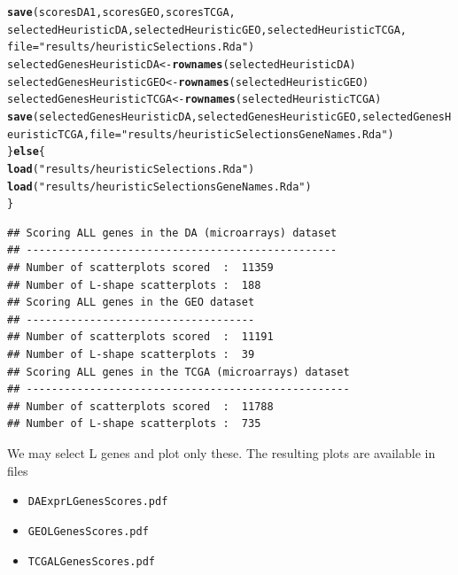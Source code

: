\documentclass[a4paper,10pt]{article}\usepackage[]{graphicx}\usepackage[]{color}
\makeatletter
\newcommand{\hlstr}[1]{\textcolor[rgb]{0.192,0.494,0.8}{#1}}%
\newcommand{\hlstd}[1]{\textcolor[rgb]{0.345,0.345,0.345}{#1}}%
\newcommand{\hlkwa}[1]{\textcolor[rgb]{0.161,0.373,0.58}{\textbf{#1}}}%
\newcommand{\hlkwb}[1]{\textcolor[rgb]{0.69,0.353,0.396}{#1}}%
\newcommand{\hlkwc}[1]{\textcolor[rgb]{0.333,0.667,0.333}{#1}}%
\newcommand{\hlkwd}[1]{\textcolor[rgb]{0.737,0.353,0.396}{\textbf{#1}}}%
\newenvironment{kframe}{%
 \def\at@end@of@kframe{}%
 \ifinner\ifhmode%
  \def\at@end@of@kframe{\end{minipage}}%
  \begin{minipage}{\columnwidth}%
 \fi\fi%
 \def\FrameCommand##1{\hskip\@totalleftmargin \hskip-\fboxsep
 \colorbox{shadecolor}{##1}\hskip-\fboxsep
     \hskip-\linewidth \hskip-\@totalleftmargin \hskip\columnwidth}%
 \MakeFramed {\advance\hsize-\width
   \@totalleftmargin\z@ \linewidth\hsize
   \@setminipage}}%
 {\par\unskip\endMakeFramed%
 \at@end@of@kframe}
\newenvironment{knitrout}{}{} %
\makeatother
\begin{document}
\begin{knitrout}
\begin{kframe}
\begin{alltt}
  \hlkwd{save}\hlstd{(scoresDA1, scoresGEO, scoresTCGA,}
       \hlstd{selectedHeuristicDA, selectedHeuristicGEO, selectedHeuristicTCGA,}
         \hlkwc{file}\hlstd{=}\hlstr{"results/heuristicSelections.Rda"}\hlstd{)}
  \hlstd{selectedGenesHeuristicDA} \hlkwb{<-} \hlkwd{rownames}\hlstd{(selectedHeuristicDA)}
  \hlstd{selectedGenesHeuristicGEO} \hlkwb{<-} \hlkwd{rownames}\hlstd{(selectedHeuristicGEO)}
  \hlstd{selectedGenesHeuristicTCGA} \hlkwb{<-} \hlkwd{rownames}\hlstd{(selectedHeuristicTCGA)}
  \hlkwd{save}\hlstd{(selectedGenesHeuristicDA,selectedGenesHeuristicGEO, selectedGenesHeuristicTCGA,} \hlkwc{file}\hlstd{=}\hlstr{"results/heuristicSelectionsGeneNames.Rda"}\hlstd{)}
\hlstd{\}}\hlkwa{else}\hlstd{\{}
    \hlkwd{load}\hlstd{(}\hlstr{"results/heuristicSelections.Rda"}\hlstd{)}
   \hlkwd{load}\hlstd{(}\hlstr{"results/heuristicSelectionsGeneNames.Rda"}\hlstd{)}
\hlstd{\}}
\end{alltt}
\begin{verbatim}
## Scoring ALL genes in the DA (microarrays) dataset 
## ------------------------------------------------- 
## Number of scatterplots scored  :  11359 
## Number of L-shape scatterplots :  188 
## Scoring ALL genes in the GEO dataset 
## ------------------------------------ 
## Number of scatterplots scored  :  11191 
## Number of L-shape scatterplots :  39 
## Scoring ALL genes in the TCGA (microarrays) dataset 
## --------------------------------------------------- 
## Number of scatterplots scored  :  11788 
## Number of L-shape scatterplots :  735
\end{verbatim}
\end{kframe}
\end{knitrout}


We may select L genes and plot only these.
The resulting plots are available in files 
\begin{itemize}
  \item \texttt{DAExprLGenesScores.pdf}
  \item \texttt{GEOLGenesScores.pdf}
  \item \texttt{TCGALGenesScores.pdf}
\end{itemize}
\end{document}
